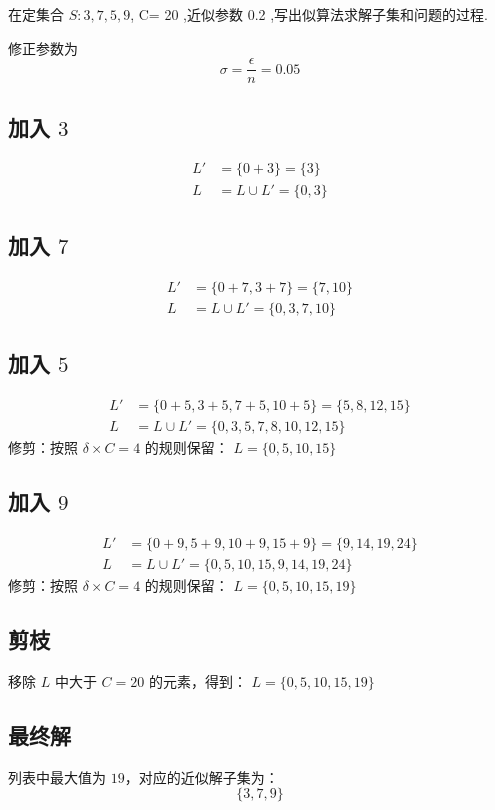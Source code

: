 \documentclass[../../main.tex]{subfiles}
\begin{document}
\begin{problem}
在定集合 $S :{ 3 , 7 , 5 , 9 }$, C= 20 ,近似参数 0.2 ,写出似算法求解子集和问题的过程.
\end{problem}

\begin{solution}
修正参数为
\begin{equation*}
    \sigma = \frac{\epsilon}{n} = 0.05
\end{equation*}

\subsection*{加入 $3$}
\begin{align*}
    L' & = \{0 + 3\} = \{3\}    \\
    L  & = L \cup L' = \{0, 3\}
\end{align*}

\subsection*{加入 $7$}
\begin{align*}
    L' & = \{0 + 7, 3 + 7\} = \{7, 10\} \\
    L  & = L \cup L' = \{0, 3, 7, 10\}
\end{align*}

\subsection*{加入 $5$}
\begin{align*}
    L' & = \{0 + 5, 3 + 5, 7 + 5, 10 + 5\} = \{5, 8, 12, 15\} \\
    L  & = L \cup L' = \{0, 3, 5, 7, 8, 10, 12, 15\}
\end{align*}
修剪：按照 $\delta \times C = 4$ 的规则保留：
\(
    L = \{0, 5, 10, 15\}
\)

\subsection*{加入 $9$}
\begin{align*}
    L' & = \{0 + 9, 5 + 9, 10 + 9, 15 + 9\} = \{9, 14, 19, 24\} \\
    L  & = L \cup L' = \{0, 5, 10, 15, 9, 14, 19, 24\}
\end{align*}
修剪：按照 $\delta \times C = 4$ 的规则保留：
\(
    L = \{0, 5, 10, 15, 19\}
\)

\subsection*{剪枝}
移除 $L$ 中大于 $C = 20$ 的元素，得到：
\(
    L = \{0, 5, 10, 15, 19\}
\)

\subsection*{最终解}
列表中最大值为 $19$，对应的近似解子集为：
\[
    \{3, 7, 9\}
\]

\end{solution}
\end{document}
